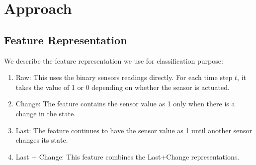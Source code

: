 \documentclass[11pt, oneside]{article}   	%
\begin{document}


\section{Approach}

\subsection{Feature Representation}
We describe the feature representation we use for classification purpose:
\begin{enumerate}
\item Raw: This uses the binary sensors readings directly. For each time step $t$, it takes the value of 1 or 0 depending on whether the sensor is actuated. 
\item Change: The feature contains the sensor value as 1 only when there is a change in the state. 
\item Last: The feature continues to have the sensor value as 1 until another sensor changes its state. 
\item Last + Change: This feature combines the Last+Change representations. 
\end{enumerate}
\end{document}
